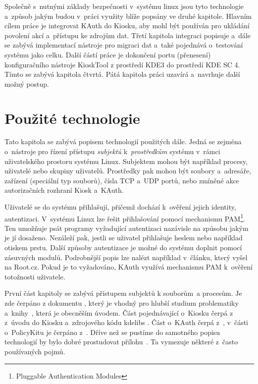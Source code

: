 Společně s~nutnými základy bezpečnosti v~systému linux jsou tyto technologie a~způsob jakým budou v~práci využity blíže popsány ve druhé kapitole. Hlavním cílem práce je integrovat KAuth do Kiosku, aby mohl být používán pro ukládání povolení akcí a~přístupu ke zdrojům dat. Třetí kapitola integraci popisuje a~dále se zabývá implementací nástroje pro migraci dat a~také pojednává o~testování systému jako celku. Další částí práce je dokončení portu (přenesení) konfiguračního nástroje KioskTool z prostředí KDE3 do prostředí KDE SC 4. Tímto se zabývá kapitola čtvrtá. Pátá kapitola práci uzavírá a~navrhuje další možný postup.

\chapter{Použité technologie}
Tato kapitola se zabývá popisem technologií použitých dále. Jedná se zejména o~nástroje pro řízení přístupu \emph{subjektů} k~\emph{prostředkům} systému v~rámci uživatelského prostoru systému Linux. Subjektem mohou být například procesy, uživatelé nebo skupiny uživatelů. Prostředky pak mohou být soubory a~adresáře, zařízení (speciální typ souborů), čísla TCP a~UDP portů, nebo zmíněné akce autorizačních rozhraní Kiosk a~KAuth.

Uživatelé se do systému přihlašují, přičemž dochází k~ověření jejich identity, autentizaci. V~systému Linux lze řešit přihlašování pomocí mechanismu PAM\footnote{Pluggable Authentication Modules}. Ten umožňuje psát programy vyžadující autentizaci nazávisle na způsobu jakým je jí dosaženo. Nezáleží pak, jestli se uživatel přihlašuje heslem nebo například otiskem prstu. Další způsoby autentizace je možné do systému doplnit pomocí zásuvných modulů. Podrobnější popis lze nalézt například v~článku, který vyšel na Root.cz\cite{rootpam}. Pokud je to vyžadováno, KAuth využívá mechanismu PAM k~ověření totožnosti uživatele.

První část kapitoly se zabývá přístupem subjektů k souborům~a procesům. Je zde čerpáno z dokumentu \cite{secureProg}, který je vhodný pro hlubší studium problematiky a~knihy~\cite{OSP}, která je obecněším úvodem. Část pojednávající o~Kiosku čerpá z z~úvodu do Kiosku \cite{Kioskintro} a~zdrojového kódu kdelibs \cite{codeKdeLibs}. Část o~KAuth čerpá z~\cite{codeKAuth,KAuthusage}, v~části o~PolicyKitu je čerpáno z~\cite{manpolkit_overview, manpolkit1, manpklocalauth}. Dříve než se pustíme do samotného popisu technologií by bylo dobré prostudovat přílohu~. Ta vymezuje některé z~často používaných pojmů.

